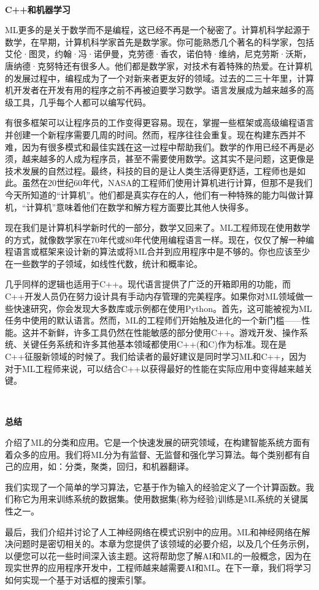 \noindent\textbf{}\ \par
\textbf{C++和机器学习} \ \par
ML更多的是关于数学而不是编程，这已经不再是一个秘密了。计算机科学起源于数学，在早期，计算机科学家首先是数学家。你可能熟悉几个著名的科学家，包括艾伦·图灵，约翰·冯·诺伊曼，克劳德·香农，诺伯特·维纳，尼克劳斯·沃斯，唐纳德·克努特还有很多人。他们都是数学家，对技术有着特殊的热爱。在计算机的发展过程中，编程成为了一个对新来者更友好的领域。过去的二三十年里，计算机开发者在开发有用的程序之前不再被迫要学习数学。语言发展成为越来越多的高级工具，几乎每个人都可以编写代码。 \par
有很多框架可以让程序员的工作变得更容易。现在，掌握一些框架或高级编程语言并创建一个新程序需要几周的时间。然而，程序往往会重复。现在构建东西并不难，因为有很多模式和最佳实践在这一过程中帮助我们。数学的作用已经不再是必须，越来越多的人成为程序员，甚至不需要使用数学。这其实不是问题，这更像是技术发展的自然过程。最终，科技的目的是让人类生活得更舒适，工程师也是如此。虽然在20世纪60年代，NASA的工程师们使用计算机进行计算，但那不是我们今天所知道的“计算机”。他们都是真实存在的人，他们有一种特殊的能力叫做计算机，“计算机”意味着他们在数学和解方程方面要比其他人快得多。 \par
现在我们是计算机科学新时代的一部分，数学又回来了。ML工程师现在使用数学的方式，就像数学家在70年代或80年代使用编程语言一样。现在，仅仅了解一种编程语言或框架来设计新的算法或将ML合并到应用程序中是不够的。你也应该至少在一些数学的子领域，如线性代数，统计和概率论。 \par
几乎同样的逻辑也适用于C++。现代语言提供了广泛的开箱即用的功能，而C++开发人员仍在努力设计具有手动内存管理的完美程序。如果你对ML领域做一些快速研究，你会发现大多数库或示例都在使用Python。首先，这可能被视为ML任务中使用的默认语言。然而，ML的工程师们开始触及进化的一个新门槛——性能。这并不新鲜，许多工具仍然在性能敏感的部分使用C++。游戏开发、操作系统、关键任务系统和许多其他基本领域都使用C++(和C)作为标准。现在是C++征服新领域的时候了。我们给读者的最好建议是同时学习ML和C++，因为对于ML工程师来说，可以结合C++以获得最好的性能在实际应用中变得越来越关键。 \par

\noindent\textbf{}\ \par
\textbf{总结} \ \par
介绍了ML的分类和应用。它是一个快速发展的研究领域，在构建智能系统方面有着众多的应用。我们将ML分为有监督、无监督和强化学习算法。每个类别都有自己的应用，如：分类，聚类，回归，和机器翻译。 \par
我们实现了一个简单的学习算法，它基于作为输入的经验定义了一个计算函数。我们称它为用来训练系统的数据集。使用数据集(称为经验)训练是ML系统的关键属性之一。 \par
最后，我们介绍并讨论了人工神经网络在模式识别中的应用。ML和神经网络在解决问题时是密切相关的。本章为您提供了该领域的必要介绍，以及几个任务示例，以便您可以花一些时间深入该主题。这将帮助您了解AI和ML的一般概念，因为在现实世界的应用程序开发中，工程师越来越需要AI和ML。在下一章，我们将学习如何实现一个基于对话框的搜索引擎。 \par

